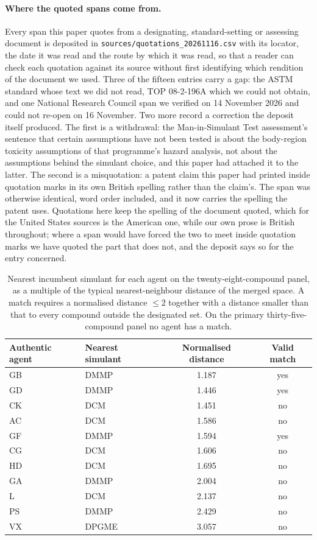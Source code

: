\documentclass[11pt,a4paper]{article}
\begin{document}
\paragraph{Where the quoted spans come from.} Every span this paper quotes from
a designating, standard-setting or assessing document is deposited in
\texttt{sources/quotations\_20261116.csv} with its locator, the date it was
read and the route by which it was read, so that a reader can check each
quotation against its source without first identifying which rendition of the
document we used. Three of the fifteen entries carry a gap: the ASTM standard
whose text we did not read, TOP 08-2-196A which we could not obtain, and one
National Research Council span we verified on 14 November 2026 and could not
re-open on 16 November. Two more record a correction the deposit itself
produced. The first is a withdrawal: the Man-in-Simulant Test assessment's
sentence that certain assumptions have not been tested is about the body-region
toxicity assumptions of that programme's hazard analysis, not about the
assumptions behind the simulant choice, and this paper had attached it to the
latter. The second is a misquotation: a patent claim this paper had printed
inside quotation marks in its own British spelling rather than the claim's. The
span was otherwise identical, word order included, and it now carries the
spelling the patent uses. Quotations here keep the spelling of the document
quoted, which for the United States sources is the American one, while our own
prose is British throughout; where a span would have forced the two to meet
inside quotation marks we have quoted the part that does not, and the deposit
says so for the entry concerned.


\begin{table}[!htb]
\centering
\caption{Nearest incumbent simulant for each agent on the twenty-eight-compound
panel, as a multiple of the typical nearest-neighbour distance of the merged
space. A match requires a normalised distance $\le 2$ together with a distance
smaller than that to every compound outside the designated set. On the primary
thirty-five-compound panel no agent has a match.}
\label{tab:match}
\small
\begin{tabular}{llcc}
\hline
Authentic agent & Nearest simulant & Normalised distance & Valid match \\
\hline
GB & DMMP & 1.187 & yes \\
GD & DMMP & 1.446 & yes \\
CK & DCM & 1.451 & no \\
AC & DCM & 1.586 & no \\
GF & DMMP & 1.594 & yes \\
CG & DCM & 1.606 & no \\
HD & DCM & 1.695 & no \\
GA & DMMP & 2.004 & no \\
L & DCM & 2.137 & no \\
PS & DMMP & 2.429 & no \\
VX & DPGME & 3.057 & no \\
\hline
\end{tabular}
\end{table}
\end{document}
